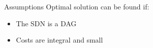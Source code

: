 \begin{frame}{Assumptions}
Optimal solution can be found if:
\begin{itemize}[<+>]
  \item The SDN is a DAG
  \item Costs are integral and small
\end{itemize}
\end{frame}